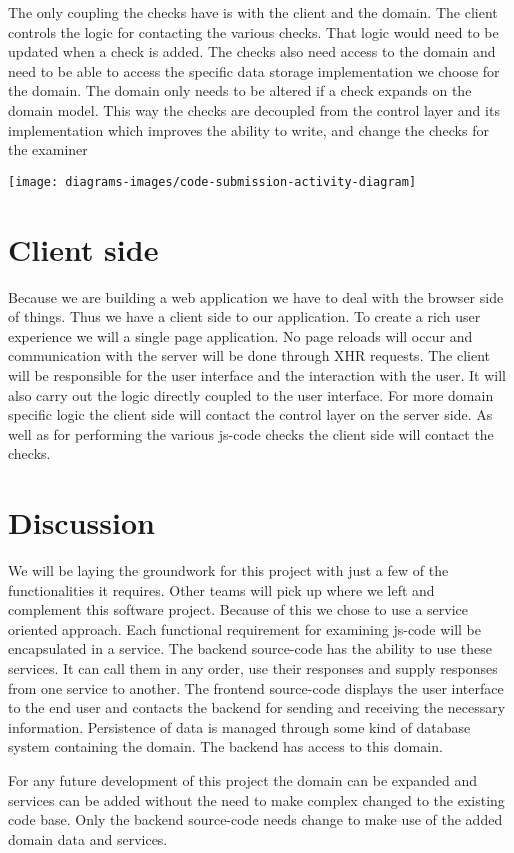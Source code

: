 The only coupling the checks have is with the client and the domain.
The client controls the logic for contacting the various checks.
That logic would need to be updated when a check is added.
The checks also need access to the domain
and need to be able to access
the specific data storage implementation we choose for the domain.
The domain only needs to be altered if a check expands on the domain model.
This way the checks are decoupled from the control layer
and its implementation
which improves the ability to write,
and change the checks for the \gls{examiner}

\texttt{[image: diagrams-images/code-submission-activity-diagram]}

\section{Client side}
Because we are building a web application
we have to deal with the browser side of things.
Thus we have a client side to our application.
To create a rich user experience we will a single page application.
No page reloads will occur
and communication with the server will be done through XHR requests.
The client will be responsible for the user interface
and the interaction with the user.
It will also carry out the logic directly coupled to the user interface.
For more domain specific logic
the client side will contact the control layer on the server side.
As well as for performing the various \gls{js-code} checks
the client side will contact the checks.

\section{Discussion}
We will be laying the groundwork for this project
with just a few of the functionalities it requires.
Other teams will pick up where we left and complement this software project.
Because of this we chose to use a service oriented approach.
Each functional requirement for examining \gls{js-code}
will be encapsulated in a service.
The backend \gls{source-code} has the ability to use these services.
It can call them in any order, use their responses
and supply responses from one service to another.
The frontend \gls{source-code} displays the user interface to the end user
and contacts the backend for sending and receiving the necessary information.
Persistence of data is managed through some kind of database system
containing the domain.
The backend has access to this domain.

For any future development of this project
the domain can be expanded
and services can be added
without the need to make complex changed to the existing code base.
Only the backend \gls{source-code} needs change
to make use of the added domain data and services.
